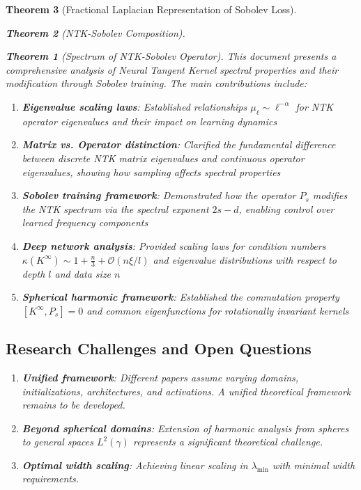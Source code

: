 \documentclass{article}
\newtheorem{theorem}{Theorem}[section]
\begin{document}
\begin{theorem}[Fractional Laplacian Representation of Sobolev Loss]
\begin{theorem}[NTK-Sobolev Composition]
\begin{theorem}[Spectrum of NTK-Sobolev Operator]
This document presents a comprehensive analysis of Neural Tangent Kernel spectral properties and their modification through Sobolev training. The main contributions include:

\begin{enumerate}
\item \textbf{Eigenvalue scaling laws}: Established relationships $\mu_\ell \sim \ell^{-\alpha}$ for NTK operator eigenvalues and their impact on learning dynamics

\item \textbf{Matrix vs. Operator distinction}: Clarified the fundamental difference between discrete NTK matrix eigenvalues and continuous operator eigenvalues, showing how sampling affects spectral properties

\item \textbf{Sobolev training framework}: Demonstrated how the operator $P_s$ modifies the NTK spectrum via the spectral exponent $2s-d$, enabling control over learned frequency components

\item \textbf{Deep network analysis}: Provided scaling laws for condition numbers $\kappa(K^{\infty}) \sim 1 + \frac{n}{3} + \mathcal{O}(n \xi / l)$ and eigenvalue distributions with respect to depth $l$ and data size $n$

\item \textbf{Spherical harmonic framework}: Established the commutation property $[K^{\infty}, P_s] = 0$ and common eigenfunctions for rotationally invariant kernels
\end{enumerate}

\subsection{Research Challenges and Open Questions}

\begin{enumerate}
\item \textbf{Unified framework}: Different papers assume varying domains, initializations, architectures, and activations. A unified theoretical framework remains to be developed.

\item \textbf{Beyond spherical domains}: Extension of harmonic analysis from spheres to general spaces $L^2(\gamma)$ represents a significant theoretical challenge.

\item \textbf{Optimal width scaling}: Achieving linear scaling in $\lambda_{\min}$ with minimal width requirements.


\end{enumerate}
\end{theorem}
\end{theorem}
\end{theorem}
\end{document}
